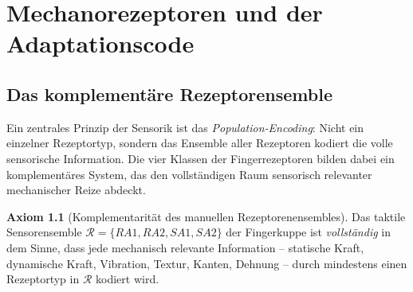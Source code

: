 ﻿\documentclass[12pt,a4paper]{report}
\theoremstyle{plain}
\theoremstyle{definition}
\newtheorem{axiom}[theorem]{Axiom}
\theoremstyle{remark}
\begin{document}
\chapter{Mechanorezeptoren und der Adaptationscode}
\label{chap:mechanorezeptoren}

\section{Das komplementäre Rezeptorensemble}

Ein zentrales Prinzip der Sensorik ist das \emph{Population-Encoding}:
Nicht ein einzelner Rezeptortyp, sondern das Ensemble aller Rezeptoren
kodiert die volle sensorische Information. Die vier Klassen der
Fingerrezeptoren bilden dabei ein komplementäres System, das den
vollständigen Raum sensorisch relevanter mechanischer Reize abdeckt.

\begin{axiom}[Komplementarität des manuellen Rezeptorenensembles]
\label{ax:komplementaritaet}
Das taktile Sensorensemble $\mathcal{R} = \{RA1, RA2, SA1, SA2\}$
der Fingerkuppe ist \emph{vollständig} in dem Sinne, dass jede
mechanisch relevante Information -- statische Kraft, dynamische
Kraft, Vibration, Textur, Kanten, Dehnung -- durch mindestens einen
Rezeptortyp in $\mathcal{R}$ kodiert wird.
\end{axiom}
\end{document}
